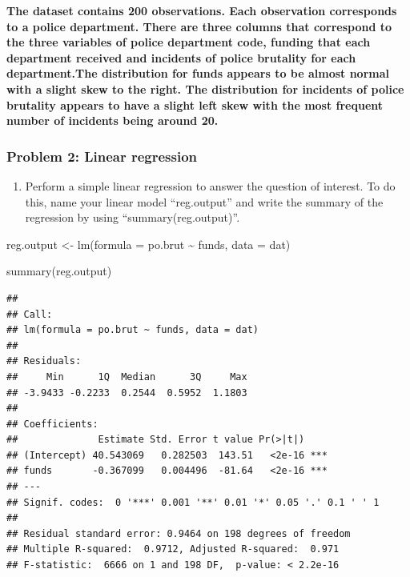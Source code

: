 \documentclass[
]{article}
\newenvironment{Shaded}{\begin{snugshade}}{\end{snugshade}}
\newcommand{\AttributeTok}[1]{\textcolor[rgb]{0.77,0.63,0.00}{#1}}
\newcommand{\FunctionTok}[1]{\textcolor[rgb]{0.00,0.00,0.00}{#1}}
\newcommand{\NormalTok}[1]{#1}
\newcommand{\OtherTok}[1]{\textcolor[rgb]{0.56,0.35,0.01}{#1}}
\newcommand{\SpecialCharTok}[1]{\textcolor[rgb]{0.00,0.00,0.00}{#1}}
\providecommand{\tightlist}{%
  \setlength{\itemsep}{0pt}\setlength{\parskip}{0pt}}
\begin{document}
\textbf{The dataset contains 200 observations. Each observation
corresponds to a police department. There are three columns that
correspond to the three variables of police department code, funding
that each department received and incidents of police brutality for each
department.The distribution for funds appears to be almost normal with a
slight skew to the right. The distribution for incidents of police
brutality appears to have a slight left skew with the most frequent
number of incidents being around 20. }

\hypertarget{problem-2-linear-regression}{%
\subsubsection{Problem 2: Linear
regression}\label{problem-2-linear-regression}}

\begin{enumerate}
\def\labelenumi{\alph{enumi}.}
\tightlist
\item
  Perform a simple linear regression to answer the question of interest.
  To do this, name your linear model ``reg.output'' and write the
  summary of the regression by using ``summary(reg.output)''.
\end{enumerate}

\begin{Shaded}
\begin{Highlighting}[]
\NormalTok{reg.output }\OtherTok{\textless{}{-}} \FunctionTok{lm}\NormalTok{(}\AttributeTok{formula =}\NormalTok{ po.brut }\SpecialCharTok{\textasciitilde{}}\NormalTok{ funds, }\AttributeTok{data =}\NormalTok{ dat)}

\FunctionTok{summary}\NormalTok{(reg.output)}
\end{Highlighting}
\end{Shaded}

\begin{verbatim}
## 
## Call:
## lm(formula = po.brut ~ funds, data = dat)
## 
## Residuals:
##     Min      1Q  Median      3Q     Max 
## -3.9433 -0.2233  0.2544  0.5952  1.1803 
## 
## Coefficients:
##              Estimate Std. Error t value Pr(>|t|)    
## (Intercept) 40.543069   0.282503  143.51   <2e-16 ***
## funds       -0.367099   0.004496  -81.64   <2e-16 ***
## ---
## Signif. codes:  0 '***' 0.001 '**' 0.01 '*' 0.05 '.' 0.1 ' ' 1
## 
## Residual standard error: 0.9464 on 198 degrees of freedom
## Multiple R-squared:  0.9712, Adjusted R-squared:  0.971 
## F-statistic:  6666 on 1 and 198 DF,  p-value: < 2.2e-16
\end{verbatim}
\end{document}
